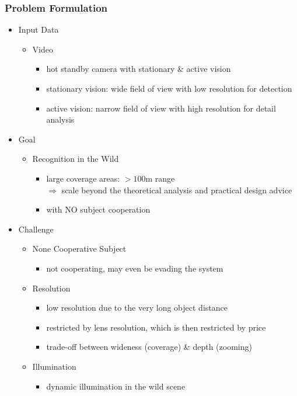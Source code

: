 \subsubsection{Problem Formulation}
\begin{itemize}
\item Input Data
	\begin{itemize}
	\item Video
		\begin{itemize}
		\item hot standby camera with stationary \& active vision
		\item stationary vision: wide field of view with low resolution for detection
		\item active vision: narrow field of view with high resolution for detail analysis
		\end{itemize}
	\end{itemize}
\item Goal
	\begin{itemize}
	\item Recognition in the Wild
		\begin{itemize}
		\item large coverage areas: $>100$m range \\
		$\Rightarrow$ scale beyond the theoretical analysis and practical design advice
		\item with NO subject cooperation
		\end{itemize}
	\end{itemize}
\item Challenge
	\begin{itemize}
	\item None Cooperative Subject
		\begin{itemize}
		\item not cooperating, may even be evading the system
		\end{itemize}
	\item Resolution
		\begin{itemize}
		\item low resolution due to the very long object distance
		\item restricted by lens resolution, which is then restricted by price
		\item trade-off between wideness (coverage) \& depth (zooming)
		\end{itemize}
	\item Illumination
		\begin{itemize}
		\item dynamic illumination in the wild scene

\end{itemize}
\end{itemize}
\end{itemize}
